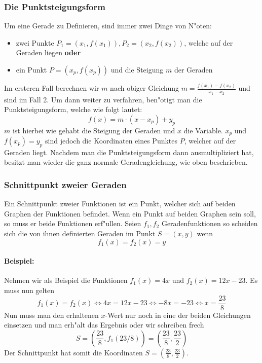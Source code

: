 \subsubsection{Die Punktsteigungsform}
Um eine Gerade zu Definieren, sind immer zwei Dinge von N"oten:
\begin{itemize}
\item zwei Punkte $P_1 = (x_1, f(x_1)), P_2 = (x_2, f(x_2))$, welche auf der Geraden liegen \textbf{oder}
\item ein Punkt $P = (x_p, f(x_p))$ und die Steigung $m$ der Geraden
\end{itemize}
Im ersteren Fall berechnen wir $m$ nach obiger Gleichung $m = \frac{f(x_1) - f(x_2)}{x_1 - x_2}$ und sind im Fall 2. Um dann weiter zu verfahren, ben"otigt man die Punktsteigungsform, welche wie folgt lautet:
\begin{equation*}
f(x) = m \cdot (x-x_p) + y_p
\end{equation*}
$m$ ist hierbei wie gehabt die Steigung der Geraden und $x$ die Variable. $x_p$ und $f(x_p) = y_p$ sind jedoch die Koordinaten eines Punktes $P$, welcher auf der Geraden liegt. Nachdem man die Punktsteigungsform dann ausmultipliziert hat, besitzt man wieder die ganz normale Geradengleichung, wie oben beschrieben.

\subsubsection{Schnittpunkt zweier Geraden}
Ein Schnittpunkt zweier Funktionen ist ein Punkt, welcher sich auf beiden Graphen der Funktionen befindet. Wenn ein Punkt auf beiden Graphen sein soll, so muss er beide Funktionen erf"ullen. Seien $f_1, f_2$ Geradenfunktionen so scheiden sich die von ihnen definierten Geraden im Punkt $S = (x, y)$ wenn
\begin{equation*}
f_1(x) = f_2(x) = y
\end{equation*}

\paragraph{Beispiel:}
Nehmen wir als Beispiel die Funktionen $f_1(x) = 4x$ und $f_2(x) = 12x - 23$. Es muss nun gelten 
\begin{equation*}
	f_1(x) = f_2(x) \iff 4x = 12x - 23 \iff -8x = -23 \iff x = \frac{23}{8}
\end{equation*}
Nun muss man den erhaltenen $x$-Wert nur noch in eine der beiden Gleichungen einsetzen und man erh"alt das Ergebnis oder wir schreiben frech
\begin{equation*}
S = \left( \frac{23}{8}, f_1(23/8) \right) = \left(\frac{23}{8}, \frac{23}{2} \right)
\end{equation*}
Der Schnittpunkt hat somit die Koordinaten $S = \left(\frac{23}{8}, \frac{23}{2} \right)$.

